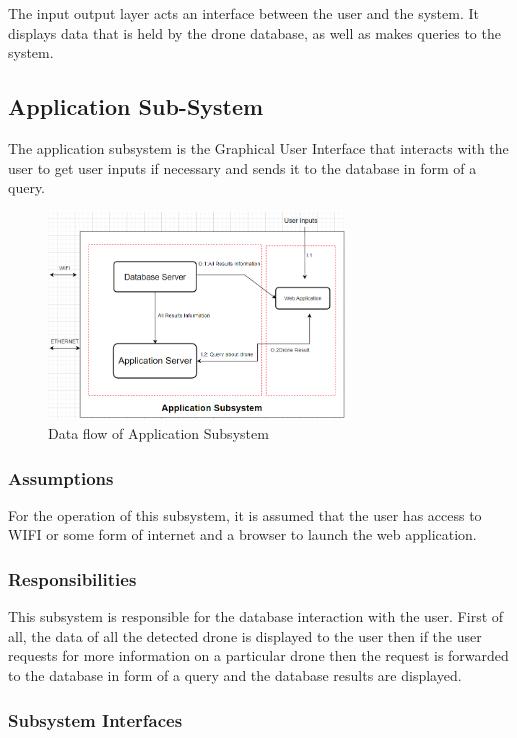 The input output layer acts an interface between the user and the system.  It displays data that is held by the drone database, as well as makes queries to the system.

\subsection{Application Sub-System}
The application subsystem is the Graphical User Interface that interacts with the user to get user inputs if necessary and sends it to the database in form of a query.

\begin{figure}[h!]
	\centering
 	\includegraphics[width=0.70\textwidth]{images/Application_Subsystem.png}
 \caption{Data flow of Application Subsystem}
\end{figure}

\subsubsection{Assumptions}
For the operation of this subsystem, it is assumed that the user has access to WIFI or some form of internet and a browser to launch the web application.

\subsubsection{Responsibilities}
This subsystem is responsible for the database interaction with the user. First of all, the data of all the detected drone is displayed to the user then if the user requests for more information on a particular drone then the request is forwarded to the database in form of a query and the database results are displayed. 

\subsubsection{Subsystem Interfaces}

